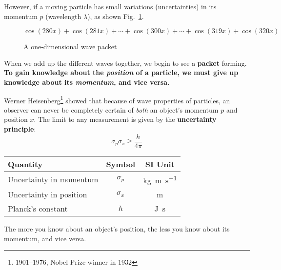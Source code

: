 However, if a moving particle has small variations (uncertainties) in its
momentum $p$ (wavelength $\lambda$), as shown Fig.~\ref{fig:packet}.
\begin{figure}[ht]
  \centering
  $\cos(280x)+\cos(281x)+\cdots+\cos(300x)+\cdots+\cos(319x)+\cos(320x)$\\
  \caption{A one-dimensional wave packet}
  \label{fig:packet}
\end{figure}
When we add up the different waves together, we begin to see a \textbf{packet}
forming.
\textbf{To gain knowledge about the \emph{position} of a particle, we must
  give up knowledge about its \emph{momentum}, and vice versa.}




Werner Heisenberg\footnote{1901--1976, Nobel Prize winner in 1932} showed that
because of wave properties of particles, an observer can never be completely
certain of \emph{both} an object's momentum $p$ and position $x$. The limit
to any measurement is given by the \textbf{uncertainty principle}:
\begin{equation}
  \boxed{\sigma_p\sigma_x\geq \frac h{4\pi}}
\end{equation}
\begin{center}
  \begin{tabular}{l|c|c}
    \rowcolor{pink}
    \textbf{Quantity} & \textbf{Symbol} & \textbf{SI Unit} \\ \hline
    Uncertainty in momentum & $\sigma_p$ & \si{\kilo\gram\metre\per\second}\\
    Uncertainty in position & $\sigma_x$ & \si\metre \\
    Planck's constant       & $h$        & \si{\joule\second}
  \end{tabular}
\end{center}
The more you know about an object's position, the less you know about its
momentum, and vice versa.




